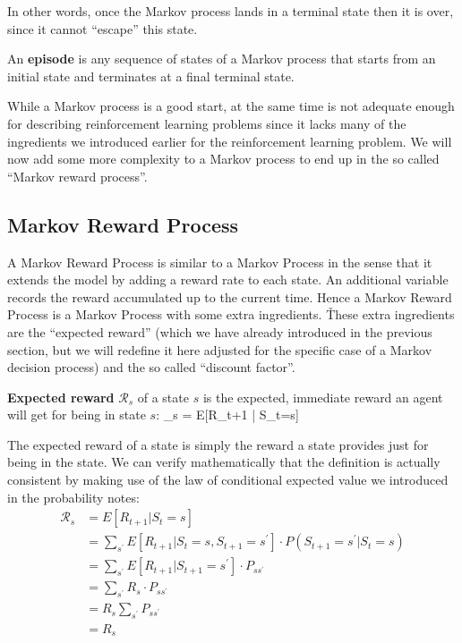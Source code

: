 In other words, once the Markov process lands in a terminal state then it is over, since it cannot ``escape'' this 
state.

\bd[Episode]
An \textbf{episode} is any sequence of states of a Markov process that starts from an initial state and terminates at
a final terminal state. 
\ed

While a Markov process is a good start, at the same time is not adequate enough for describing reinforcement 
learning problems since it lacks many of the ingredients we introduced earlier for the reinforcement learning problem. 
We will now add some more complexity to a Markov process to end up in the so called ``Markov reward process''.

\subsection{Markov Reward Process}

A Markov Reward Process is similar to a Markov Process in the sense that it extends the model by adding a reward rate
to each state. An additional variable records the reward accumulated up to the current time. Hence a Markov Reward 
Process is a Markov Process with some extra ingredients. \v

These extra ingredients are the ``expected reward'' (which we have already introduced in the previous section, but we
will redefine it here adjusted for the specific case of a Markov decision process) and the so called ``discount 
factor''.

\textbf{Expected reward} $\mathcal{R}_{s}$ of a state $s$ is the expected, immediate reward an agent will get for 
being in state $s$:
\bse
{}_{s} = E[R_{t+1} | S_t=s]
\ese
\ed

The expected reward of a state is simply the reward a state provides just for being in the state. We can verify 
mathematically that the definition is actually consistent by making use of the law of conditional expected value we 
introduced in the probability notes:
\begin{align*}
\mathcal{R}_{s} &= E[R_{t+1} | S_t=s] \\
&= \sum_{s^\prime} E[R_{t+1} | S_t=s, S_{t+1} = s^\prime] \cdot P(S_{t+1} = s^\prime | S_t = s) \\
&= \sum_{s^\prime} E[R_{t+1} | S_{t+1} = s^\prime] \cdot P_{s s^\prime} \\
&= \sum_{s^\prime} R_{s} \cdot P_{s s^\prime} \\
&= R_{s} \sum_{s^\prime} P_{s s^\prime} \\
&= R_{s}
\end{align*}

